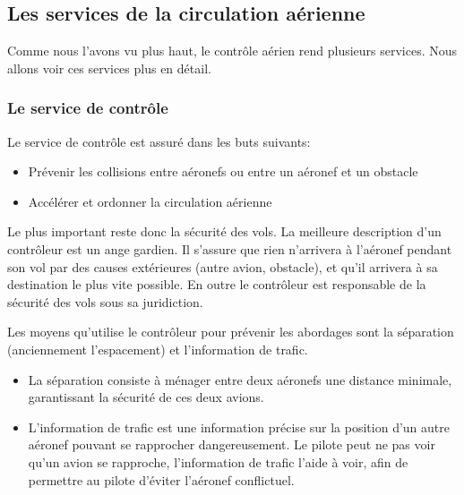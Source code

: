     \subsection{Les services de la circulation aérienne\label{servicesaerien}}
Comme nous l'avons vu plus haut, le contrôle aérien rend plusieurs services. Nous allons voir ces services plus en détail.

        \subsubsection{Le service de contrôle}
Le service de contrôle est assuré dans les buts suivants:
\begin{itemize}
    \item Prévenir les collisions entre aéronefs ou entre un aéronef et un obstacle
    \item Accélérer et ordonner la circulation aérienne
\end{itemize}\medskip

Le plus important reste donc la sécurité des vols. La meilleure description d'un contrôleur est un ange gardien. Il s'assure que rien n'arrivera à l'aéronef pendant son vol par des causes extérieures (autre avion, obstacle), et qu'il arrivera à sa destination le plus vite possible. En outre le contrôleur est responsable de la sécurité des vols sous sa juridiction.

Les moyens qu'utilise le contrôleur pour prévenir les abordages sont la séparation (anciennement l'espacement) et l'information de trafic.
\begin{itemize}
    \item La séparation consiste à ménager entre deux aéronefs une distance minimale, garantissant la sécurité de ces deux avions.
    \item L'information de trafic est une information précise sur la position d'un autre aéronef pouvant se rapprocher dangereusement. Le pilote peut ne pas voir qu'un avion se rapproche, l'information de trafic l'aide à voir, afin de permettre au pilote d'éviter l'aéronef conflictuel.
\end{itemize}\medskip


